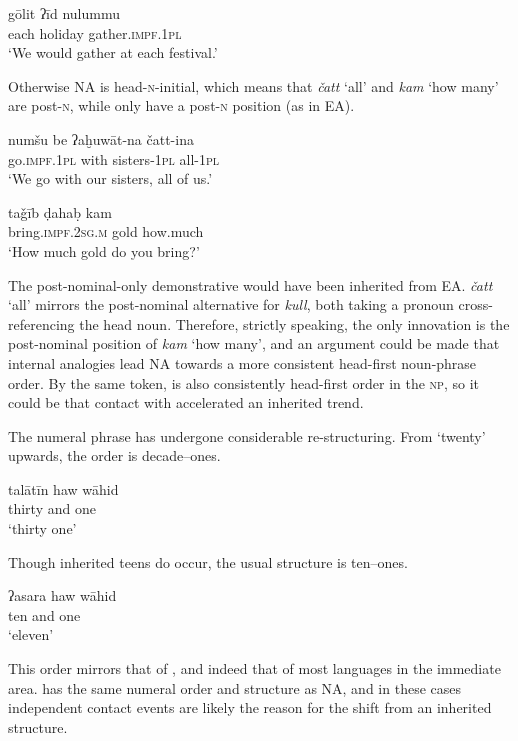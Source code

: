 \documentclass[output=paper]{langsci/langscibook}
\begin{document}
\ea \gll gōlit ʔīd nulummu\\
     each holiday gather\textsc{.impf.1pl}\\
\glt ‘We would gather at each festival.’
\z

Otherwise NA is head-\textsc{n}-initial, which means that \textit{čatt} ‘all’ and \textit{kam} ‘how many’ are post-\textsc{n}, while  only have a post-\textsc{n} position (as in EA).

\ea \gll numšu be ʔaḫuwāt-na čatt-ina\\
     go.\textsc{impf.1pl} with sisters-1\textsc{pl} all-\textsc{1pl}\\
\glt ‘We go with our sisters, all of us.’
\z

\ea \gll taǧīb ḍahaḅ kam\\
     bring.\textsc{impf.2sg.m} gold how.much\\
\glt ‘How much gold do you bring?’
\z

The post-nominal-only demonstrative would have been inherited from EA. \textit{čatt} ‘all’ mirrors the post-nominal alternative for \textit{kull}, both taking a pronoun cross-referencing the head noun. Therefore, strictly speaking, the only innovation is the post-nominal position of \textit{kam} ‘how many’, and an argument could be made that internal analogies lead NA towards a more consistent head-first noun-phrase order. By the same token,  is also consistently head-first order in the \textsc{np}, so it could be that contact with  accelerated an inherited trend.

The numeral phrase has undergone considerable re-structuring. From `twenty' upwards, the order is decade--ones.

\ea \gll talātīn haw wāhid\\
     thirty and one\\
\glt ‘thirty one’
\z

Though inherited teens do occur, the usual structure is ten--ones.

\ea \gll ʔasara haw wāhid\\
     ten and one\\
\glt ‘eleven’
\z

This order mirrors that of  \citep[203]{Hutchison1981}, and indeed that of most languages in the immediate  area.   has the same numeral order and structure as NA, and in these cases independent contact events are likely the reason for the shift from an inherited structure.
\end{document}
